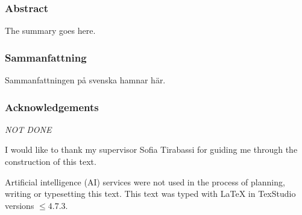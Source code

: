 \clearpage{\thispagestyle{empty}}
\begin{center}
	\subsubsection*{Abstract}
\end{center}
	
	The summary goes here. %
	
\begin{center}
	\item\subsubsection*{Sammanfattning}
\end{center}
	
	Sammanfattningen på svenska hamnar här. %

\begin{center}
	\item\subsubsection*{Acknowledgements}
\end{center}
	
	\textit{NOT DONE}
	
	I would like to thank my supervisor Sofia Tirabassi for guiding me through the construction of this text. %
	
	Artificial intelligence (AI) services were not used in the process of planning, writing or typesetting this text. 
	This text was typed with {\LaTeX} in TexStudio versions $\leq4.7.3$.


